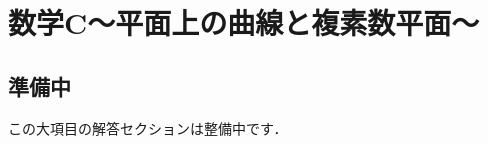 \documentclass[../../ms_a.tex]{subfiles}
\begin{document}
\section{数学C～平面上の曲線と複素数平面～}

\subsection*{準備中}
この大項目の解答セクションは整備中です．
\end{document}
